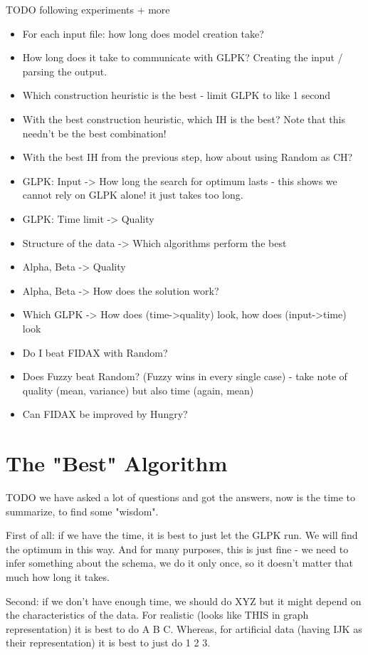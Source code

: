 \documentclass[a4paper,12pt,oneside]{report}
\begin{document}
TODO following experiments + more

\begin{itemize}
	\item For each input file: how long does model creation take?
	\item How long does it take to communicate with GLPK? Creating the input / parsing the output.
	\item Which construction heuristic is the best - limit GLPK to like 1 second
	\item With the best construction heuristic, which IH is the best? Note that this needn't be the best combination!
	\item With the best IH from the previous step, how about using Random as CH?
	\item GLPK: Input -> How long the search for optimum lasts - this shows we cannot rely on GLPK alone! it just takes too long.
	\item GLPK: Time limit -> Quality
	\item Structure of the data -> Which algorithms perform the best
	\item Alpha, Beta -> Quality
	\item Alpha, Beta -> How does the solution work?
	\item Which GLPK -> How does (time->quality) look, how does (input->time) look
	\item Do I beat FIDAX with Random?
	\item Does Fuzzy beat Random? (Fuzzy wins in every single case) - take note of quality (mean, variance) but also time (again, mean)
  \item Can FIDAX be improved by Hungry?
\end{itemize}

\section{The "Best" Algorithm}

TODO we have asked a lot of questions and got the answers, now is the time to summarize, to find some "wisdom".

First of all: if we have the time, it is best to just let the GLPK run. 
We will find the optimum in this way. 
And for many purposes, this is just fine - we need to infer something about the schema, we do it only once, so it doesn't matter that much how long it takes.

Second: if we don't have enough time, we should do XYZ but it might depend on the characteristics of the data.
For realistic (looks like THIS in graph representation) it is best to do A B C.
Whereas, for artificial data (having IJK as their representation) it is best to just do 1 2 3.
\end{document}
